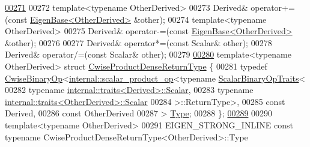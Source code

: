 \begin{DoxyCode}
\hyperlink{group___sparse_core___module_ac66a3a6035f4b89a9e85c0bcaf8a4364}{00271} 
00272     \textcolor{keyword}{template}<\textcolor{keyword}{typename} OtherDerived>
00273     Derived& operator+=(\textcolor{keyword}{const} \hyperlink{group___core___module_struct_eigen_1_1_eigen_base}{EigenBase<OtherDerived>} &other);
00274     \textcolor{keyword}{template}<\textcolor{keyword}{typename} OtherDerived>
00275     Derived& operator-=(\textcolor{keyword}{const} \hyperlink{group___core___module_struct_eigen_1_1_eigen_base}{EigenBase<OtherDerived>} &other);
00276 
00277     Derived& operator*=(\textcolor{keyword}{const} Scalar& other);
00278     Derived& operator/=(\textcolor{keyword}{const} Scalar& other);
00279 
\hyperlink{struct_eigen_1_1_sparse_matrix_base_1_1_cwise_product_dense_return_type}{00280}     \textcolor{keyword}{template}<\textcolor{keyword}{typename} OtherDerived> \textcolor{keyword}{struct }\hyperlink{struct_eigen_1_1_sparse_matrix_base_1_1_cwise_product_dense_return_type}{CwiseProductDenseReturnType} \{
00281       \textcolor{keyword}{typedef} \hyperlink{group___core___module_class_eigen_1_1_cwise_binary_op}{CwiseBinaryOp}<\hyperlink{struct_eigen_1_1internal_1_1scalar__product__op}{internal::scalar\_product\_op}<\textcolor{keyword}{typename} 
      \hyperlink{group___core___module_struct_eigen_1_1_scalar_binary_op_traits}{ScalarBinaryOpTraits}<
00282                                                           \textcolor{keyword}{typename} 
      \hyperlink{struct_eigen_1_1internal_1_1traits}{internal::traits<Derived>::Scalar},
00283                                                           \textcolor{keyword}{typename} 
      \hyperlink{struct_eigen_1_1internal_1_1traits}{internal::traits<OtherDerived>::Scalar}
00284                                                         >::ReturnType>,
00285                             \textcolor{keyword}{const} Derived,
00286                             \textcolor{keyword}{const} OtherDerived
00287                           > \hyperlink{group___core___module_class_eigen_1_1_cwise_binary_op}{Type};
00288     \};
\hyperlink{group___sparse_core___module_a3f810c062c1bc3cad4ae82be15c15636}{00289} 
00290     \textcolor{keyword}{template}<\textcolor{keyword}{typename} OtherDerived>
00291     EIGEN\_STRONG\_INLINE \textcolor{keyword}{const} \textcolor{keyword}{typename} CwiseProductDenseReturnType<OtherDerived>::Type

\end{DoxyCode}
